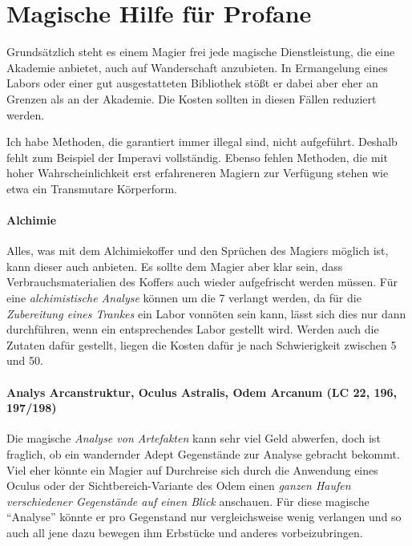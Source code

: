 \section{Magische Hilfe für Profane}
Grundsätzlich steht es einem Magier frei jede magische Dienstleistung, die eine Akademie anbietet, auch auf Wanderschaft anzubieten. In Ermangelung eines Labors oder einer gut ausgestatteten Bibliothek stößt er dabei aber eher an Grenzen als an der Akademie. Die Kosten sollten in diesen Fällen reduziert werden.

Ich habe Methoden, die garantiert immer illegal sind, nicht aufgeführt. Deshalb fehlt zum Beispiel der Imperavi vollständig. Ebenso fehlen Methoden, die mit hoher Wahrscheinlichkeit erst erfahreneren Magiern zur Verfügung stehen wie etwa ein Transmutare Körperform.

\paragraph{Alchimie}
Alles, was mit dem Alchimiekoffer und den Sprüchen des Magiers möglich ist, kann dieser auch anbieten. Es sollte dem Magier aber klar sein, dass Verbrauchsmaterialien des Koffers auch wieder aufgefrischt werden müssen. Für eine \textit{alchimistische Analyse} können um die \SI{7}{\D} verlangt werden, da für die \textit{Zubereitung eines Trankes} ein Labor vonnöten sein kann, lässt sich dies nur dann durchführen, wenn ein entsprechendes Labor gestellt wird. Werden auch die Zutaten dafür gestellt, liegen die Kosten dafür je nach Schwierigkeit zwischen \SI{5}{\D} und \SI{50}{\D}.

\paragraph{Analys Arcanstruktur, Oculus Astralis, Odem Arcanum (LC 22, 196, 197/198)}
Die magische \textit{Analyse von Artefakten} kann sehr viel Geld abwerfen, doch ist fraglich, ob ein wandernder Adept Gegenstände zur Analyse gebracht bekommt. Viel eher könnte ein Magier auf Durchreise sich durch die Anwendung eines Oculus oder der Sichtbereich-Variante des Odem einen \textit{ganzen Haufen verschiedener Gegenstände auf einen Blick} anschauen. Für diese magische \enquote{Analyse} könnte er pro Gegenstand nur vergleichsweise wenig verlangen und so auch all jene dazu bewegen ihm Erbstücke und anderes vorbeizubringen.

